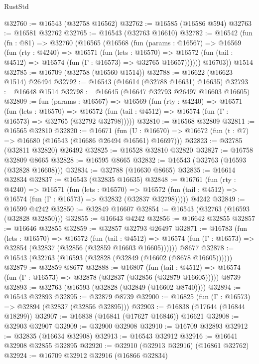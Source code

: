 \begin{lexlean}{RustStd}
\begin{coremodule}
@32760 := @16543 (@32758 @16562)
@32762 := @16585 (@16586 @594)
@32763 := @16581 @32762
@32765 := @16543 (@32763 @16610)
@32782 := @16542
    (fun (fn : @81) =>
    @32760
      (@16565
        (@16568
          (fun (params : @16567) =>
          @16569
            (fun (rty : @4240) =>
            @16571
              (fun (lets : @16570) =>
              @16572 (fun (tail : @4512) => @16574 (fun (Γ : @16573) => @32765 @16657))))))
        @16703))
    @1514
@32785 := @16709 (@32758 (@16560 @1514))
@32788 := @16622 (@16623 @1514) @26494
@32792 := @16543 (@16614 (@32788 @16631) @16635)
@32793 := @16648 @1514
@32798 := @16645 (@16647 @32793 @26497 @16603 @16605)
@32809 := fun (params : @16567) =>
  @16569
    (fun (rty : @4240) =>
    @16571
      (fun (lets : @16570) =>
      @16572 (fun (tail : @4512) => @16574 (fun (Γ : @16573) => @32765 (@32792 @32798)))))
@32810 := @16568 @32809
@32811 := @16565 @32810
@32820 := @16671
    (fun (U : @16670) => @16672 (fun (t : @7) => @16680 (@16543 (@16686 @26494 @16561) @16697)))
@32823 := @32785 (@32811 @32820) @26492
@32825 := @16528 @32810 @32820
@32827 := @16758 @32809 @8665
@32828 := @16595 @8665
@32832 := @16543 (@32763 (@16593 (@32828 @16608)))
@32834 := @32788 (@16630 @8665)
@32835 := @16614 @32834
@32837 := @16543 (@32835 @16635)
@32848 := @16761
    (fun (rty : @4240) =>
    @16571
      (fun (lets : @16570) =>
      @16572 (fun (tail : @4512) => @16574 (fun (Γ : @16573) => @32832 (@32837 @32798)))))
    @4242
@32849 := @16599 @4242
@32850 := @32849 @16607
@32854 := @16543 (@32763 (@16593 (@32828 @32850)))
@32855 := @16643 @4242
@32856 := @16642 @32855
@32857 := @16646 @32855
@32859 := @32857 @32793 @26497
@32871 := @16783
    (fun (lets : @16570) =>
    @16572
      (fun (tail : @4512) =>
      @16574 (fun (Γ : @16573) => @32854 (@32837 (@32856 (@32859 @16603 @16605))))))
    @8677
@32878 := @16543 (@32763 (@16593 (@32828 (@32849 (@16602 (@8678 @16605))))))
@32879 := @32859 @8677
@32888 := @16807
    (fun (tail : @4512) => @16574 (fun (Γ : @16573) => @32878 (@32837 (@32856 (@32879 @16605)))))
    @8739
@32893 := @32763 (@16593 (@32828 (@32849 (@16602 @8740))))
@32894 := @16543 @32893
@32895 := @32879 @8739
@32900 := @16825 (fun (Γ : @16573) => @32894 (@32837 (@32856 @32895)))
@32903 := @16838 (@17644 (@16844 @18299))
@32907 := @16838 (@16841 (@17627 @16846)) @16621
@32908 := @32903 @32907
@32909 := @32900 @32908
@32910 := @16709 @32893
@32912 := @32835 (@16634 @32908)
@32913 := @16543 @32912
@32916 := @16641 @32908 @32855 @32895
@32920 := @32910 (@32913 @32916) (@16861 @32762)
@32924 := @16709 @32912 @32916 (@16866 @32834)

\end{coremodule}
\end{lexlean}
